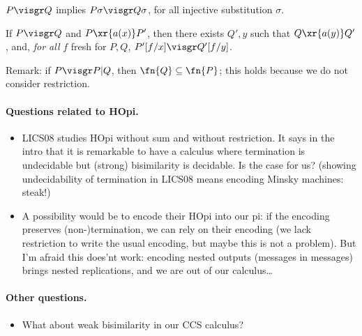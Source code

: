 \documentclass{llncs}
\begin{document}
\begin{lem}\label{ground:subst}
  $P\visgr Q$ implies $P\sigma\visgr Q\sigma$, for all injective
  substitution $\sigma$.
\end{lem}

\begin{lem}
  If $P\visgr Q$ and $P\xr{a(x)}P'$, then there exists $Q',y$ such
  that $Q\xr{a(y)}Q'$, and, \emph{for all} $f$ fresh for $P, Q$,
  $P'[f/x]\visgr Q'[f/y]$.
\end{lem}

Remark: if $P\visgr P|Q$, then $\fn{Q}\subseteq\fn{P}$; this holds
because we do not consider restriction.


\paragraph{Questions related to HOpi.}

\begin{itemize}
\item LICS08 studies HOpi without sum and without restriction. It says
  in the intro that it is remarkable to have a calculus where
  termination is undecidable but (strong) bisimilarity is decidable.
  Is the case for us? (showing undecidability of termination in LICS08
  means encoding Minsky machines: steak!)
\item A possibility would be to encode their HOpi into our pi: if the
  encoding preserves (non-)termination, we can rely on their encoding
  (we lack restriction to write the usual encoding, but maybe this is
  not a problem). But I'm afraid this does'nt work: encoding nested
  outputs (messages in messages) brings nested replications, and we
  are out of our calculus\dots
\end{itemize}


\paragraph{Other questions.}
\begin{itemize}
\item What about weak bisimilarity in our CCS calculus?
\end{itemize}

\fi





\end{document}
